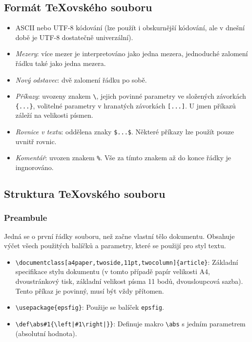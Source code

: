 \documentclass[a4paper,11pt,twoside]{article}
\def\abs#1{\left|#1\right|}
\begin{document}
    \subsection{Formát \TeX{}ovského souboru}
    \begin{itemize}
        \item ASCII nebo UTF-8 kódování (lze použít i obskurnější kódování, ale v dnešní době je UTF-8 dostatečně univerzální).
        \item \emph{Mezery}: více mezer je interpretováno jako jedna mezera, jednoduché zalomení řádku také jako jedna mezera.
        \item \emph{Nový odstavec}: dvě zalomení řádku po sobě.
        \item \emph{Příkazy}: uvozeny znakem \verb+\+, jejich povinné parametry ve složených závorkách \verb+{...}+, volitelné parametry v hranatých závorkách \verb+[...]+.
            U jmen příkazů záleží na velikosti písmen.
        \item \emph{Rovnice v textu}: oddělena znaky \verb+$...$+. Některé příkazy lze použít pouze uvnitř rovnic.
        \item \emph{Komentář}: uvozen znakem \verb+%+. Vše za tímto znakem až do konce řádky je ingnorováno.
    \end{itemize}

    \subsection{Struktura \TeX{}ovského souboru}
        \subsubsection{Preambule}
            Jedná se o první řádky souboru, než začne vlastní tělo dokumentu.
            Obsahuje výčet všech použitých balíčků a parametry, které se použijí pro styl textu.
            \begin{itemize}
                \item \verb+\documentclass[a4paper,twoside,11pt,twocolumn]{article}+: Základní specifikace stylu dokumentu (v tomto případě papír velikosti A4, dvoustránkový tisk, základní velikost písma 11 bodů, dvousloupcová sazba).
                Tento příkaz je povinný, musí být vždy přítomen.

                \item \verb+\usepackage{epsfig}+: Použije se balíček \verb+epsfig+.
                
                \item \verb+\def\abs#1{\left|#1\right|}}+: Definuje makro \verb+\abs+ s jedním parametrem (absolutní hodnota).
            \end{itemize}
\end{document}
